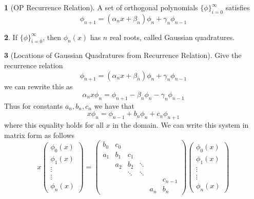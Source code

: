 \documentclass[12pt]{article}
\theoremstyle{definition}
\newtheorem{theorem}{\color{ForestGreen}{\textbf{Theorem}}}
\begin{document}
\begin{theorem}[OP Recurrence Relation]
A set of orthogonal polynomials $\{\phi\}_{i=0}^\infty$ satisfies
\begin{equation}
\phi_{n+1} = (\alpha_n x + \beta_n)\phi_n + \gamma_n \phi_{n-1}
\end{equation}
\end{theorem}

\begin{theorem}
If $\{\phi\}_{i=0}^\infty$, then $\phi_n(x)$ has $n$ real roots, called Gaussian quadratures.
\end{theorem}

\begin{theorem}[Locations of Gaussian Quadratures from Recurrence Relation]
Give the recurrence relation
\begin{equation}
\phi_{n+1} = (\alpha_n x + \beta_n)\phi_n + \gamma_n \phi_{n-1}
\end{equation}
we can rewrite this as
\begin{equation}
\alpha_n x \phi_n = \phi_{n+1} - \beta_n \phi_n - \gamma_n \phi_{n-1}
\end{equation}
Thus for constants $a_n,b_n,c_n$ we have that
\begin{equation}
x \phi_n = \phi_{n-1} +  b_n \phi_n + c_n \phi_{n+1}
\end{equation}
where this equality holds for all $x$ in the domain. We can write this system in matrix form as follows
\begin{equation}
x
\begin{pmatrix}
\phi_0(x) \\ \phi_1(x) \\ \vdots \\ \vdots \\ \phi_n(x)
\end{pmatrix}
=
\begin{pmatrix}
b_0 & c_0 \\
a_1 & b_1 & c_1 \\
& a_2 & b_2 & \ddots \\
& & \ddots & \ddots \\
& & & & & c_{n-1} \\
& & & & a_n & b_n
\end{pmatrix}
\begin{pmatrix}
\phi_0(x) \\ \phi_1(x) \\ \vdots \\ \vdots \\ \phi_n(x)
\end{pmatrix}

\end{equation}
\end{theorem}
\end{document}

